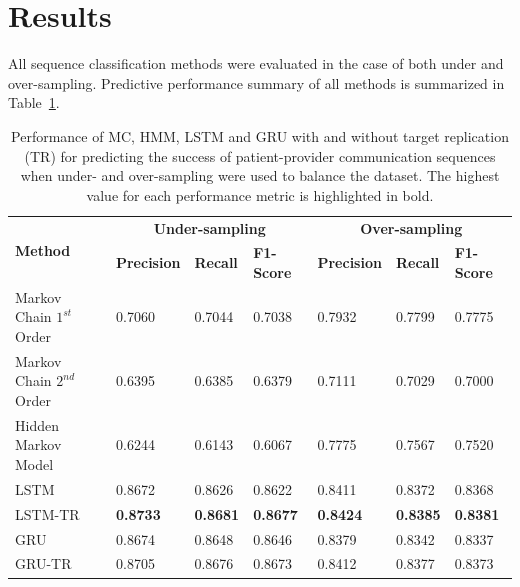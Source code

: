 \documentclass{amia_summit_2018}
\begin{document}
\section*{Results}
All sequence classification methods were evaluated in the case of both under and over-sampling. Predictive performance summary of all methods is summarized in Table~\ref{tab:result_under_over_sampled}.\\
 
\begin{table}[ht]
\centering
\caption{Performance of MC, HMM, LSTM and GRU with and without target replication (TR) for predicting the success of patient-provider communication sequences when under- and over-sampling were used to balance the dataset. The highest value for each performance metric is highlighted in bold.}
\label{tab:result_under_over_sampled}
  \begin{tabular}{|l|l|l|l|l|l|l|}
  \hline
   \multirow{2}{*}{\textbf{Method}} & \multicolumn{3}{|c|}{\textbf{Under-sampling}} & \multicolumn{3}{|c|}{\textbf{Over-sampling}} \\\cline{2-7}
   & \textbf{Precision}  & \textbf{Recall} & \textbf{F1-Score} & \textbf{Precision}  & \textbf{Recall} & \textbf{F1-Score}\\ \hline    
    
 Markov Chain $1^{st}$ Order & 0.7060 & 0.7044 & 0.7038 & 0.7932 & 0.7799 & 0.7775 \\ \hline
 Markov Chain $2^{nd}$ Order & 0.6395 & 0.6385 & 0.6379 & 0.7111 & 0.7029 & 0.7000\\ \hline
 Hidden Markov Model & 0.6244 & 0.6143 & 0.6067 & 0.7775 & 0.7567 & 0.7520\\ \hline
 LSTM & 0.8672 & 0.8626 & 0.8622 & 0.8411 & 0.8372 & 0.8368\\ \hline
 LSTM-TR & \textbf{0.8733} & \textbf{0.8681} & \textbf{0.8677} & \textbf{0.8424} & \textbf{0.8385} & \textbf{0.8381}\\ \hline
 GRU & 0.8674 & 0.8648 & 0.8646 & 0.8379 & 0.8342 & 0.8337\\ \hline
 GRU-TR & 0.8705 & 0.8676 & 0.8673 & 0.8412 & 0.8377 & 0.8373\\ \hline 
  \end{tabular}
\end{table}  
\end{document}
